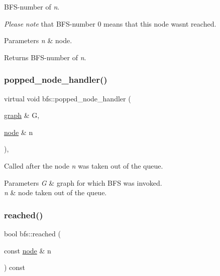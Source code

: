 B\+F\+S-\/number of {\itshape n}. 

{\itshape Please} {\itshape note} that B\+F\+S-\/number 0 means that this node wasn\textquotesingle{}t reached.


\begin{DoxyParams}{Parameters}
{\em n} & node. \\
\hline
\end{DoxyParams}
\begin{DoxyReturn}{Returns}
B\+F\+S-\/number of {\itshape n}. 
\end{DoxyReturn}
\mbox{\label{classbfs_a3f161fe9f45e0a69892f355a889c3516}} 
\subsubsection{\texorpdfstring{popped\+\_\+node\+\_\+handler()}{popped\_node\_handler()}}
{\footnotesize\ttfamily virtual void bfs\+::popped\+\_\+node\+\_\+handler (\begin{DoxyParamCaption}\item[{\mbox{\hyperlink{classgraph}{graph}} \&}]{G,  }\item[{\mbox{\hyperlink{classnode}{node}} \&}]{n }\end{DoxyParamCaption})\hspace{0.3cm}{\ttfamily [inline]}, {\ttfamily [virtual]}}



Called after the node {\itshape n} was taken out of the queue. 


\begin{DoxyParams}{Parameters}
{\em G} & graph for which B\+FS was invoked. \\
\hline
{\em n} & node taken out of the queue. \\
\hline
\end{DoxyParams}
\mbox{\label{classbfs_ab1a7882a7d56e0e72bbe1a344381bdae}} 
\subsubsection{\texorpdfstring{reached()}{reached()}}
{\footnotesize\ttfamily bool bfs\+::reached (\begin{DoxyParamCaption}\item[{const \mbox{\hyperlink{classnode}{node}} \&}]{n }\end{DoxyParamCaption}) const\hspace{0.3cm}{\ttfamily [inline]}}




